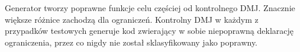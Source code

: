

Generator tworzy poprawne funkcje celu %
częściej od kontrolnego DMJ. 
Znacznie większe różnice zachodzą dla ograniczeń. Kontrolny DMJ w każdym z przypadków testowych generuje kod zwierający w sobie niepoprawną deklarację ograniczenia, przez co nigdy nie został sklasyfikowany jako poprawny. %

